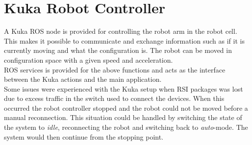 \section{Kuka Robot Controller}
\label{sec:rc_kuka}
A Kuka ROS node is provided for controlling the robot arm in the robot cell. This makes it possible to communicate and exchange information such as if it is currently moving and what the configuration is. The robot can be moved in configuration space with a given speed and acceleration. \\

ROS services is provided for the above functions and acts as the interface between the Kuka actions and the main application.\\

Some issues were experienced with the Kuka setup when RSI packages was lost due to excess traffic in the switch used to connect the devices. When this occurred the robot controller stopped and the robot could not be moved before a manual reconnection. This situation could be handled by switching the state of the system to \textit{idle}, reconnecting the robot and switching back to \textit{auto}-mode. The system would then continue from the stopping point.

